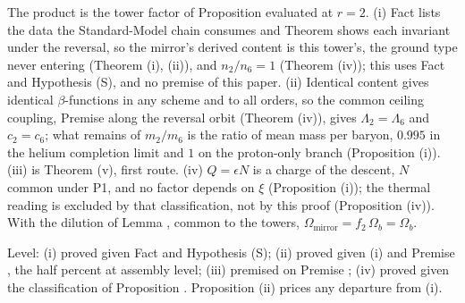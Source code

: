 The product is the tower factor of Proposition  evaluated at $r = 2$. (i) Fact  lists the data the Standard-Model chain consumes and Theorem  shows each invariant under the reversal, so the mirror's derived content is this tower's, the ground type never entering (Theorem (i), (ii)), and $n_{2}/n_{6} = 1$ (Theorem (iv)); this uses Fact  and Hypothesis (S), and no premise of this paper. (ii) Identical content gives identical $\beta$-functions in any scheme and to all orders, so the common ceiling coupling, Premise  along the reversal orbit (Theorem (iv)), gives $\Lambda_{2} = \Lambda_{6}$ and $c_{2} = c_{6}$; what remains of $m_{2}/m_{6}$ is the ratio of mean mass per baryon, $0.995$ in the helium completion limit and $1$ on the proton-only branch (Proposition (i)). (iii) is Theorem (v), first route. (iv) $Q = \epsilon N$ is a charge of the descent, $N$ common under P1, and no factor depends on $\xi$ (Proposition (i)); the thermal reading is excluded by that classification, not by this proof (Proposition (iv)). With the dilution of Lemma , common to the towers, $\Omega_{\mathrm{mirror}} = f_{2}\,\Omega_{b} = \Omega_{b}$.

Level: (i) proved given Fact  and Hypothesis (S); (ii) proved given (i) and Premise , the half percent at assembly level; (iii) premised on Premise ; (iv) proved given the classification of Proposition . Proposition (ii) prices any departure from (i).

